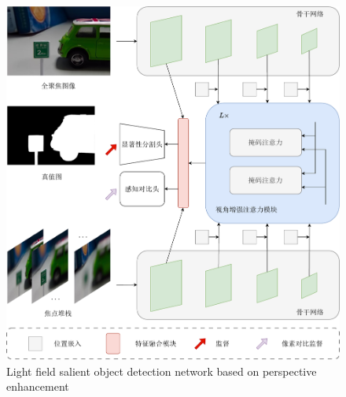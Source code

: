 % 
% 
%
%
%
%
%
\begin{figure}[!ht]
	\centering
	\includegraphics[width=0.95\linewidth]{figures/chapter4/chpt4_overview}
	{Light field salient object detection network based on perspective enhancement}  
	\label{cpt4_fig1:chpt4_overview}
\end{figure}
%
%
%
%
%





